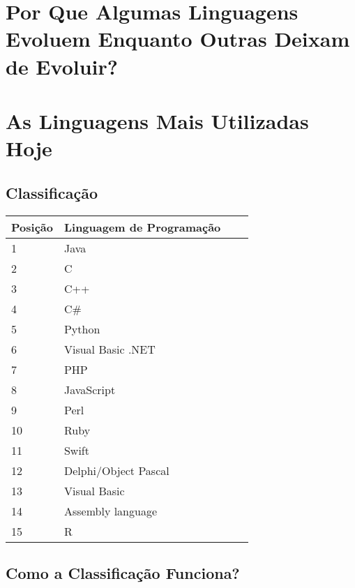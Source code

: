 \documentclass[
    12pt,               %
    openany,            %
    twoside,            %
    a4paper,            %
    brazil              %
    ]{abntex2}
\begin{document}
\part{Por Que Algumas Linguagens Evoluem Enquanto Outras Deixam de Evoluir?}

\part{As Linguagens Mais Utilizadas Hoje}

\chapter{Classificação}

\begin{center}
\begin{tabular}{ | l | l | l | p{5cm} |}
\hline
Posição & Linguagem de Programação \\ \hline
1 & Java \\ \hline
2 & C \\ \hline
3 & C++ \\ \hline
4 & C\# \\ \hline
5 & Python \\ \hline
6 & Visual Basic .NET \\ \hline
7 & PHP \\ \hline
8 & JavaScript \\ \hline
9 & Perl \\ \hline
10 & Ruby \\ \hline
11 & Swift \\ \hline
12 & Delphi/Object Pascal \\ \hline
13 & Visual Basic \\ \hline
14 & Assembly language \\ \hline
15 & R \\ \hline
\end{tabular}
\end{center}

\chapter{Como a Classificação Funciona?}


\end{document}
